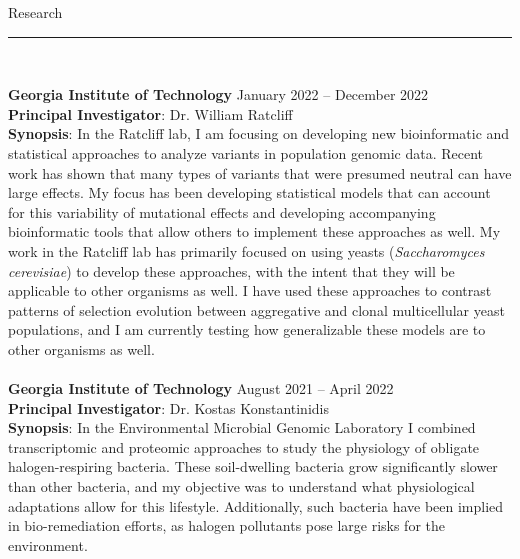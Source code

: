 \documentclass{article}
\begin{document}
\begin{flushleft}
{\Large Research} \rule{16.51cm}{0.4pt}\\
\end{flushleft}
\textbf{Georgia Institute of Technology} \hfill January 2022 – December 2022 \\
\textbf{Principal Investigator}: Dr. William Ratcliff \\
\textbf{Synopsis}: In the Ratcliff lab, I am focusing on developing new bioinformatic and statistical approaches to analyze variants in population genomic data. 
Recent work has shown that many types of variants that were presumed neutral can have large effects. My focus has been developing statistical 
models that can account for this variability of mutational effects and developing accompanying bioinformatic tools that allow others to implement 
these approaches as well. My work in the Ratcliff lab has primarily focused on using yeasts (\emph{Saccharomyces cerevisiae}) to develop these approaches, 
with the intent that they will be applicable to other organisms as well. I have used these approaches to contrast patterns of selection 
evolution between aggregative and clonal multicellular yeast populations, and I am currently testing how generalizable these models are 
to other organisms as well. \\
\\
\textbf{Georgia Institute of Technology} \hfill August 2021 – April 2022 \\
\textbf{Principal Investigator}: Dr. Kostas Konstantinidis \\
\textbf{Synopsis}: In the Environmental Microbial Genomic Laboratory I combined transcriptomic and proteomic approaches to study the physiology of 
obligate halogen-respiring bacteria. These soil-dwelling bacteria grow significantly slower than other bacteria, and my objective was to understand what 
physiological adaptations allow for this lifestyle. Additionally, such bacteria have been implied in bio-remediation efforts, as halogen pollutants pose 
large risks for the environment.\\
\end{document}

